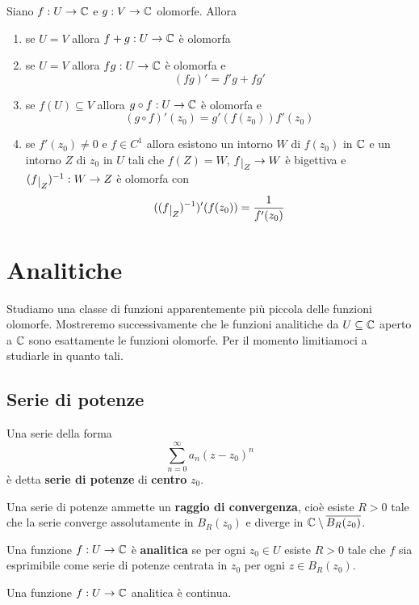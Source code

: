 \begin{multicols*}{2}
\begin{theorem}\label{ProprietaAritmeticheOlomorfe}
Siano $f:U\to \mathbb{C}$ e $g:V\to \mathbb{C}$ olomorfe. Allora
\begin{enumerate}[noitemsep]
\item se $U=V$ allora $f+g:U\to \mathbb{C}$ \`e olomorfa
\item se $U=V$ allora $fg:U\to \mathbb{C}$ \`e olomorfa e
\[(fg)'=f'g+fg'\]
\item se $f(U)\subseteq V$ allora $g\circ f:U\to \mathbb{C}$ \`e olomorfa e
\[(g\circ f)'(z_0)=g'(f(z_0))f'(z_0)\]
\item se $f'(z_0)\neq 0$ e $f\in C^1$ allora esistono un intorno $W$ di $f(z_0)$ in $\mathbb{C}$ e un intorno $Z$ di $z_0$ in $U$ tali che $f(Z)=W$, $f\res Z\to W$ \`e bigettiva e $(f\res Z)\ii :W\to Z$ \`e olomorfa con
\[((f\res Z)\ii)'(f(z_0))=\frac1{f'(z_0)}\]
\end{enumerate}
\end{theorem}



\section{Analitiche}
Studiamo una classe di funzioni apparentemente pi\`u piccola delle funzioni olomorfe. Mostreremo successivamente che le funzioni analitiche da $U\subseteq \mathbb{C}$ aperto a $\mathbb{C}$ sono esattamente le funzioni olomorfe. Per il momento limitiamoci a studiarle in quanto tali.

\subsection{Serie di potenze}
\begin{definition}
Una serie della forma
\[\sum_{n=0}^\infty a_n(z-z_0)^n\]
\`e detta \textbf{serie di potenze} di \textbf{centro} $z_0$.
\end{definition}
\begin{remark}
Una serie di potenze ammette un \textbf{raggio di convergenza}, cio\`e esiste $R>0$ tale che la serie converge assolutamente in $B_R(z_0)$ e diverge in $\mathbb{C}\setminus \overline{B_R(z_0)}$.
\end{remark}

\begin{definition}
Una funzione $f:U\to \mathbb{C}$ \`e \textbf{analitica} se per ogni $z_0\in U$ esiste $R>0$ tale che $f$ sia esprimibile come serie di potenze centrata in $z_0$ per ogni $z\in B_R(z_0)$.
\end{definition}
\begin{proposition}\label{AnaliticaImplicaContinua}
Una funzione $f:U\to \mathbb{C}$ analitica \`e continua.
\end{proposition}


\end{multicols*}
